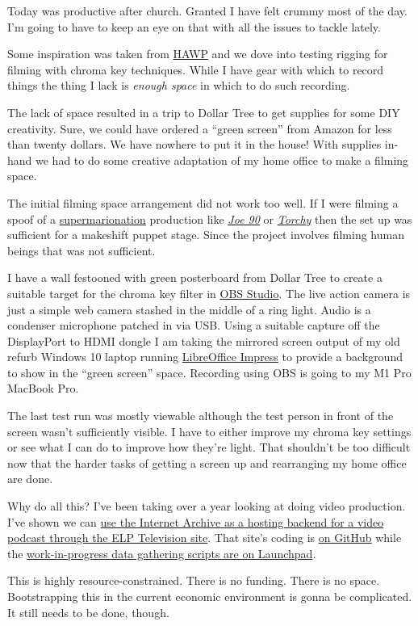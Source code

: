 Today was productive after church. Granted I have felt crummy most of
the day. I'm going to have to keep an eye on that with all the issues to
tackle lately.

Some inspiration was taken from
\href{https://www.youtube.com/user/HeyAshWhatchaPlayin}{HAWP} and we
dove into testing rigging for filming with chroma key techniques. While
I have gear with which to record things the thing I lack is \emph{enough
space} in which to do such recording.

The lack of space resulted in a trip to Dollar Tree to get supplies for
some DIY creativity. Sure, we could have ordered a ``green screen'' from
Amazon for less than twenty dollars. We have nowhere to put it in the
house! With supplies in-hand we had to do some creative adaptation of my
home office to make a filming space.

The initial filming space arrangement did not work too well. If I were
filming a spoof of a
\href{https://en.wikipedia.org/wiki/Supermarionation}{supermarionation}
production like \href{https://youtu.be/boL2xqSrhTU}{\emph{Joe 90}} or
\href{https://youtu.be/0D9MKbk-3cc}{\emph{Torchy}} then the set up was
sufficient for a makeshift puppet stage. Since the project involves
filming human beings that was not sufficient.

I have a wall festooned with green posterboard from Dollar Tree to
create a suitable target for the chroma key filter in
\href{https://obsproject.com/}{OBS Studio}. The live action camera is
just a simple web camera stashed in the middle of a ring light. Audio is
a condenser microphone patched in via USB. Using a suitable capture off
the DisplayPort to HDMI dongle I am taking the mirrored screen output of
my old refurb Windows 10 laptop running
\href{https://www.libreoffice.org/discover/impress/}{LibreOffice
Impress} to provide a background to show in the ``green screen'' space.
Recording using OBS is going to my M1 Pro MacBook Pro.

The last test run was mostly viewable although the test person in front
of the screen wasn't sufficiently visible. I have to either improve my
chroma key settings or see what I can do to improve how they're light.
That shouldn't be too difficult now that the harder tasks of getting a
screen up and rearranging my home office are done.

Why do all this? I've been taking over a year looking at doing video
production. I've shown we can \href{https://coyote.works/}{use the
Internet Archive as a hosting backend for a video podcast through the
ELP Television site}. That site's coding is
\href{https://github.com/skellat/skellat.github.io}{on GitHub} while the
\href{https://code.launchpad.net/~skellat/+git/nws-data-gathering}{work-in-progress
data gathering scripts are on Launchpad}.

This is highly resource-constrained. There is no funding. There is no
space. Bootstrapping this in the current economic environment is gonna
be complicated. It still needs to be done, though.
